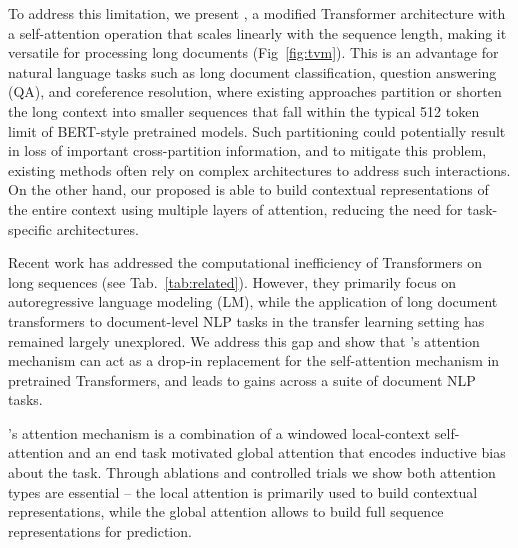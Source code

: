 To address this limitation, we present \model, a modified Transformer architecture
with a self-attention operation that scales linearly with the sequence length, making it versatile for processing long documents (Fig~\ref{fig:tvm}).
This is an advantage for natural language tasks such as long document classification, question answering (QA), and coreference resolution, where existing approaches partition or shorten the long context into smaller sequences that fall within the typical 512 token limit of BERT-style pretrained models. Such partitioning could potentially result in loss of important cross-partition information, and to mitigate this problem, existing methods often rely on complex architectures to address such interactions. On the other hand, our proposed \model is able to build contextual representations of the entire context using multiple layers of attention, reducing the need for task-specific architectures. 

Recent work has addressed the computational inefficiency of Transformers on long sequences (see Tab.~\ref{tab:related}).
However, they primarily focus on autoregressive language modeling (LM), 
while the application of long document transformers to document-level NLP tasks in the transfer learning setting \cite{NIPS2015_5949,Peters2018DeepCW,Howard2018UniversalLM,bert} has remained largely unexplored.  We address this gap and show that \model's attention mechanism can act as a drop-in replacement for the self-attention mechanism in pretrained Transformers, and leads to gains across a suite of document NLP tasks.

\model's attention mechanism is a combination of a windowed local-context self-attention and an end task motivated global attention that encodes inductive bias about the task.
Through ablations and controlled trials we show both attention types are essential -- the local attention is primarily used to build contextual representations, while the global attention allows \model to build full sequence representations for prediction.




